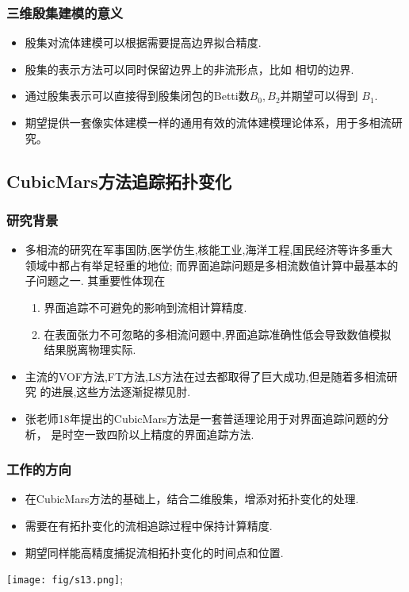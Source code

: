 \documentclass[UTF8]{ctexbeamer}	%
\theoremstyle{plain}
\theoremstyle{definition}
\theoremstyle{remark}
\numberwithin{equation}{section}
\begin{document}
\begin{frame}
    \frametitle{三维殷集建模的意义}
    \begin{itemize}
        \item 殷集对流体建模可以根据需要提高边界拟合精度.
        \item 殷集的表示方法可以同时保留边界上的非流形点，比如
        相切的边界.
        \item 通过殷集表示可以直接得到殷集闭包的Betti数$B_0, B_2$并期望可以得到
        $B_1$.
        \item 期望提供一套像实体建模一样的通用有效的流体建模理论体系，用于多相流研究。
    \end{itemize}
\end{frame}

\subsection{CubicMars方法追踪拓扑变化}
\begin{frame}
    \frametitle{研究背景}
    \begin{itemize}
        \item 多相流的研究在军事国防,医学仿生,核能工业,海洋工程,国民经济等许多重大
        领域中都占有举足轻重的地位; 而界面追踪问题是多相流数值计算中最基本的子问题之一.
        其重要性体现在
        \begin{enumerate}
            \item 界面追踪不可避免的影响到流相计算精度.
            \item 在表面张力不可忽略的多相流问题中,界面追踪准确性低会导致数值模拟
            结果脱离物理实际.
        \end{enumerate}
        \item 主流的VOF方法,FT方法,LS方法在过去都取得了巨大成功,但是随着多相流研究
        的进展,这些方法逐渐捉襟见肘.
        \item 张老师18年提出的CubicMars方法是一套普适理论用于对界面追踪问题的分析，
        是时空一致四阶以上精度的界面追踪方法.
    \end{itemize}
    
\end{frame}

\begin{frame}
    \frametitle{工作的方向} 
    \begin{itemize}
        \item 在CubicMars方法的基础上，结合二维殷集，增添对拓扑变化的处理.
        \item 需要在有拓扑变化的流相追踪过程中保持计算精度.
        \item 期望同样能高精度捕捉流相拓扑变化的时间点和位置.
    \end{itemize}
    \centering
    \texttt{[image: fig/s13.png]};
\end{frame}
\end{document}

